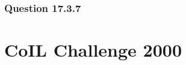 \documentclass[10pt,a4paper]{article}
\begin{document}
			\subsubsection*{Question 17.3.7}
   	
   	\section{CoIL Challenge 2000}
   	
          	
\end{document}
